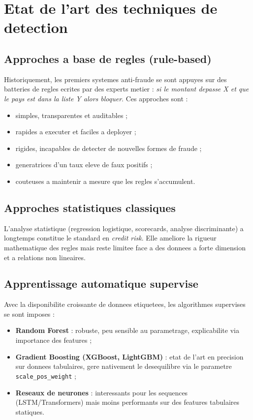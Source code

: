 \documentclass[12pt,a4paper,oneside]{report}
\begin{document}
\section{Etat de l'art des techniques de detection}

\subsection{Approches a base de regles (rule-based)}

Historiquement, les premiers systemes anti-fraude se sont appuyes sur des
batteries de regles ecrites par des experts metier : \emph{si le montant
depasse X et que le pays est dans la liste Y alors bloquer}. Ces approches
sont :

\begin{itemize}[leftmargin=*]
  \item[\(+\)] simples, transparentes et auditables ;
  \item[\(+\)] rapides a executer et faciles a deployer ;
  \item[\(-\)] rigides, incapables de detecter de nouvelles formes de fraude ;
  \item[\(-\)] generatrices d'un taux eleve de faux positifs ;
  \item[\(-\)] couteuses a maintenir a mesure que les regles s'accumulent.
\end{itemize}

\subsection{Approches statistiques classiques}

L'analyse statistique (regression logistique, scorecards, analyse
discriminante) a longtemps constitue le standard en \emph{credit risk}. Elle
ameliore la rigueur mathematique des regles mais reste limitee face a des
donnees a forte dimension et a relations non lineaires.

\subsection{Apprentissage automatique supervise}

Avec la disponibilite croissante de donnees etiquetees, les algorithmes
supervises se sont imposes :

\begin{itemize}[leftmargin=*]
  \item \textbf{Random Forest} : robuste, peu sensible au parametrage,
        explicabilite via importance des features ;
  \item \textbf{Gradient Boosting (XGBoost, LightGBM)} : etat de l'art en
        precision sur donnees tabulaires, gere nativement le desequilibre via
        le parametre \texttt{scale\_pos\_weight} ;
  \item \textbf{Reseaux de neurones} : interessants pour les sequences
        (LSTM/Transformers) mais moins performants sur des features tabulaires
        statiques.
\end{itemize}
\end{document}
